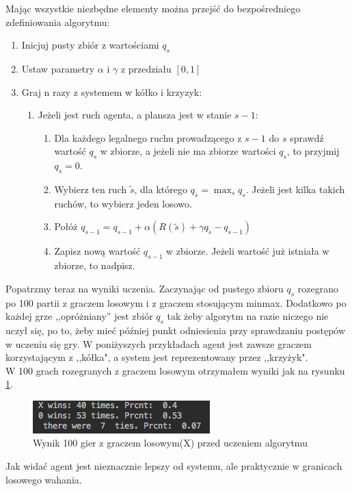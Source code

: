 \documentclass[licencjacka]{pracamgr}
\begin{document}
Mając wszystkie niezbędne elementy można przejść do bezpośredniego zdefiniowania algorytmu:


\begin{enumerate}
	\item{Inicjuj pusty zbiór z wartościami $q_{s}$}
	\item{Ustaw parametry $\alpha$ i $\gamma$ z przedziału $[0, 1]$}
	\item{Graj n razy z systemem w kółko i krzyzyk:}
	\begin{enumerate}
		\item{Jeżeli jest ruch agenta, a plansza jest w stanie $s-1$:}
		\begin{enumerate}
			\item{Dla każdego legalnego ruchu prowadzącego z $s-1$ do $s$  sprawdź wartość $q_{s}$ w zbiorze, a jeżeli nie ma zbiorze wartości $q_{s}$, to przyjmij $q_{s}=0$.}
			\item{Wybierz ten ruch $\tilde{s}$, dla którego $q_{\tilde{s}} =\max_{s} q_{s}$. Jeżeli jest kilka takich ruchów, to wybierz jeden losowo.}
			\item{Połóż $q_{s-1} = q_{s-1} + \alpha(R(\tilde{s}) + \gamma  q_{\tilde{s}} - q_{s-1} )$ }
			\item{Zapisz nową wartość $q_{s-1}$ w zbiorze. Jeżeli wartość już istniała w zbiorze, to nadpisz.}
		\end{enumerate}
	\end{enumerate}
\end{enumerate}

Popatrzmy  teraz na wyniki uczenia. Zaczynając od pustego zbioru $q_{s}$ rozegrano po 100 partii z graczem losowym i z graczem stosującym minmax. Dodatkowo po każdej grze ,,opróżniany'' jest zbiór $q_{s}$ tak żeby algorytm na razie niczego nie uczył się,   po to, żeby mieć później punkt odniesienia przy sprawdzaniu postępów w uczeniu się gry. W poniżyszych przykładach agent jest zawsze graczem korzystającym z ,,kółka", a system jest reprezentowany przez ,,krzyżyk". \\

W 100 grach rozegranych z graczem losowym otrzymałem wyniki jak na rysunku \ref{Rys14}.\\
\begin{figure}[h!]
	\includegraphics [scale=0.7]{Qtable_vs_Rnd_untrained.png}
	\caption{Wynik 100 gier z graczem losowym(X) przed uczeniem algorytmu}
	\label{Rys14}
\end{figure}
Jak widać agent jest nieznacznie lepszy od systemu, ale praktycznie w granicach losowego wahania.\\
\end{document}
